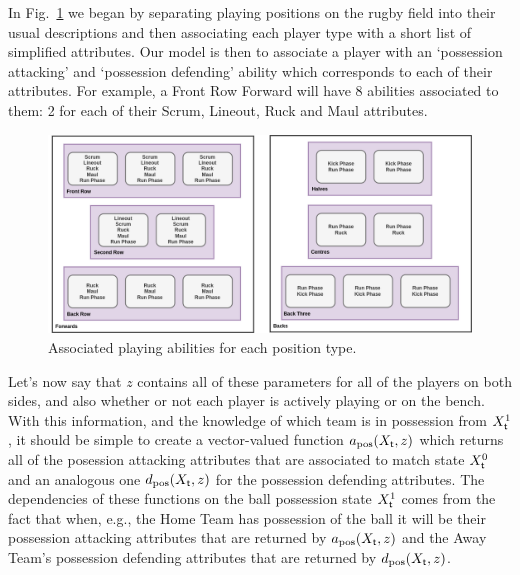 In Fig.~\ref{fig:player-abilities} we began by separating playing positions on the rugby field into their usual descriptions and then associating each player type with a short list of simplified attributes. Our model is then to associate a player with an `possession attacking' and `possession defending' ability which corresponds to each of their attributes. For example, a Front Row Forward will have 8 abilities associated to them: 2 for each of their {\sf Scrum}, {\sf Lineout}, {\sf Ruck} and {\sf Maul} attributes.

\begin{figure}[h]
\includegraphics[width=15cm]{images/rugby-player-abilities.drawio.png}
\caption{Associated playing abilities for each position type.}
\label{fig:player-abilities}
\end{figure}

Let's now say that $z$ contains all of these parameters for all of the players on both sides, and also whether or not each player is actively playing or on the bench. With this information, and the knowledge of which team is in possession from $X^1_{\sf t}$, it should be simple to create a vector-valued function $a_{\rm pos}(X_{\sf t}, z)$ which returns all of the posession attacking attributes that are associated to match state $X^0_{\sf t}$ and an analogous one $d_{\rm pos}(X_{\sf t}, z)$ for the possession defending attributes. The dependencies of these functions on the ball possession state $X^1_{\sf t}$ comes from the fact that when, e.g., the {\sf Home Team} has possession of the ball it will be their possession attacking attributes that are returned by $a_{\rm pos}(X_{\sf t}, z)$ and the {\sf Away Team}'s possession defending attributes that are returned by $d_{\rm pos}(X_{\sf t}, z)$.

